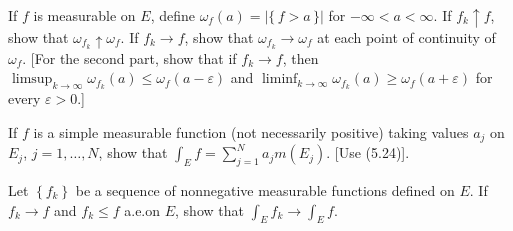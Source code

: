 \begin{problem}
  If $f$ is measurable on $E$, define $\omega_f(a)=|\{\,f>a\,\}|$ for
  $-\infty<a<\infty$. If $f_k\uparrow f$, show that
  $\omega_{f_k}\uparrow\omega_f$. If $f_k\to f$, show that
  $\omega_{f_k}\to\omega_f$ at each point of continuity of $\omega_f$. [For
  the second part, show that if $f_k\to f$, then
  $\limsup_{k\to\infty}\omega_{f_k}(a)\leq\omega_f(a-\varepsilon)$ and
  $\liminf_{k\to\infty}\omega_{f_k}(a)\geq\omega_f(a+\varepsilon)$ for
  every $\varepsilon>0$.]
\end{problem}
\begin{solution}
\end{solution}

\begin{problem}
  If $f$ is a simple measurable function (not necessarily positive) taking
  values $a_j$ on $E_j$, $j=1,\ldots,N$, show that
  $\int_E f=\sum_{j=1}^N a_jm(E_j)$. [Use (5.24)].
\end{problem}
\begin{solution}
\end{solution}

\begin{problem}
  Let $\left\{f_k\right\}$ be a sequence of nonnegative measurable
  functions defined on $E$. If $f_k\to f$ and $f_k\leq f$ a.e.\@ on $E$,
  show that $\int_E f_k\to\int_E f$.
\end{problem}
\begin{solution}
\end{solution}

